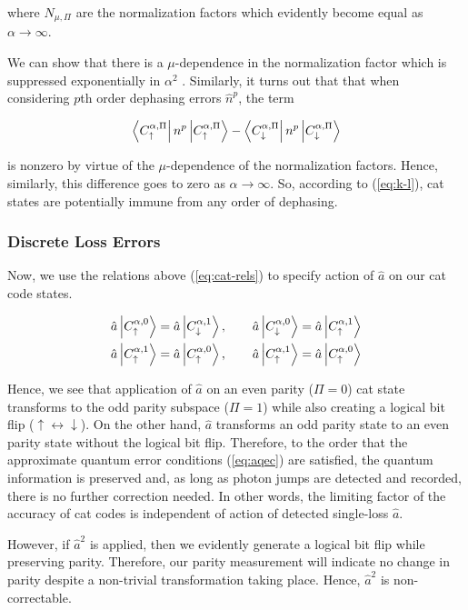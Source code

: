 \documentclass[12]{amsart}
\newcommand\0{\mathbf{0}}
\newcommand\<{\langle}
\renewcommand\>{\rangle}
\begin{document}
where $N_{\mu, \Pi}$ are the normalization factors which evidently become equal as $\alpha \rightarrow \infty$. 


We can show that there is a $\mu$-dependence in the normalization factor which is suppressed exponentially in $\alpha^2$ \cite{albert2018multimode}. Similarly, it turns out that that when considering $p$th order dephasing errors $\hat{n}^p$, the term

$$
\bra{C^{\alpha, \Pi}_{\uparrow}} n^p \ket{C^{\alpha, \Pi}_{\uparrow}} - \bra{C^{\alpha, \Pi}_{\downarrow}} n^p \ket{C^{\alpha, \Pi}_{\downarrow}}
$$ 

is nonzero by virtue of the $\mu$-dependence of the normalization factors. Hence, similarly, this difference goes to zero as $\alpha \rightarrow \infty$. So, according to (\ref{eq:k-l}), cat states are potentially immune from any order of dephasing.

\subsubsection{Discrete Loss Errors}

Now, we use the relations above (\ref{eq:cat-rels}) to specify action of $\hat{a}$ on our cat code states.

\begin{align*}
\hat{a}	\ket{C^{\alpha, 0}_{\uparrow}} &= \hat{a}	\ket{C^{\alpha, 1}_{\downarrow}}, \qquad
\hat{a}	\ket{C^{\alpha, 0}_{\downarrow}} = \hat{a}	\ket{C^{\alpha, 1}_{\uparrow}}\\
\hat{a}	\ket{C^{\alpha, 1}_{\uparrow}} &= \hat{a}	\ket{C^{\alpha, 0}_{\uparrow}},\qquad 
\hat{a}	\ket{C^{\alpha, 1}_{\uparrow}} = \hat{a}	\ket{C^{\alpha, 0}_{\uparrow}}
\end{align*}

Hence, we see that application of $\hat{a}$ on an even parity ($\Pi = 0$) cat state transforms to the odd parity subspace ($\Pi = 1$) while also creating a logical bit flip ($\uparrow \leftrightarrow \downarrow$). On the other hand, $\hat{a}$ transforms an odd parity state to an even parity state without the logical bit flip. Therefore, to the order that the approximate quantum error conditions (\ref{eq:aqec}) are satisfied, the quantum information is preserved and, as long as photon jumps are detected and recorded, there is no further correction needed. In other words, the limiting factor of the accuracy of cat codes is independent of action of detected single-loss $\hat{a}$.

However, if $\hat{a}^2$ is applied, then we evidently generate a logical bit flip while preserving parity. Therefore, our parity measurement will indicate no change in parity despite a non-trivial transformation taking place. Hence, $\hat{a}^2$ is non-correctable.
\end{document}
